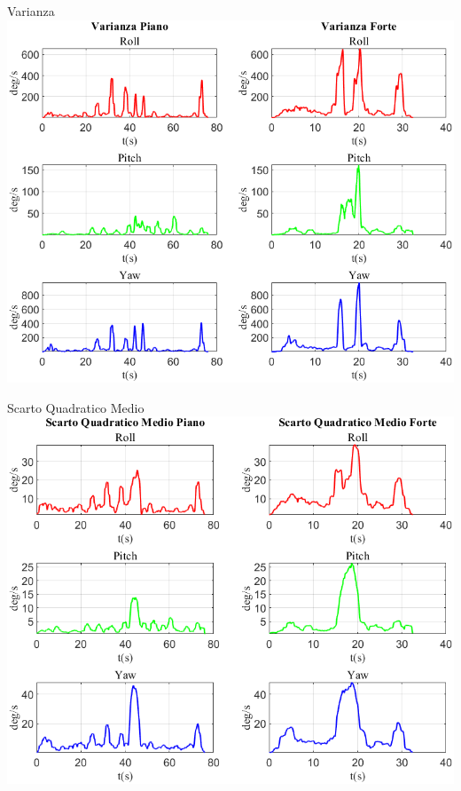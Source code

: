 \documentclass[beamer]{standalone}
\begin{document}
	
	\begin{frame}{{Varianza}}
		\centering\includegraphics[height=.8\textheight]{figure/VAng/Varianza}
	\end{frame}
	
	
	\begin{frame}{{Scarto Quadratico Medio}}
		\centering\includegraphics[height=.8\textheight]{figure/VAng/Scarto Quadratico Medio}
	\end{frame}
	
\end{document}
